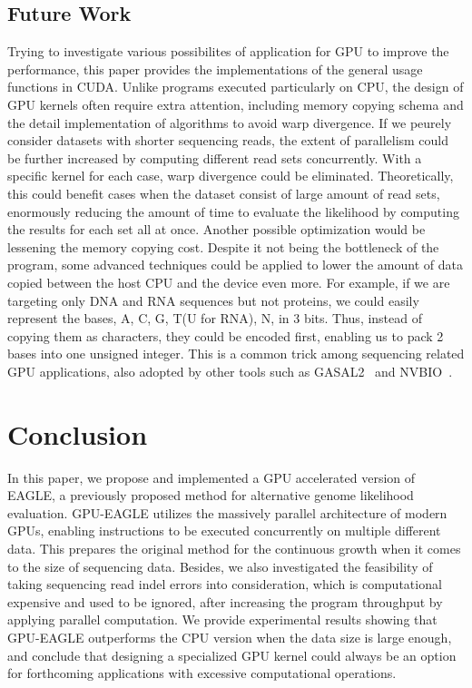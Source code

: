 \documentclass{PHlab-thesis}
\begin{document}
\section{Future Work}
Trying to investigate various possibilites of application for GPU to improve the performance, this paper provides the implementations of the general usage functions in CUDA. Unlike programs executed particularly on CPU, the design of GPU kernels often require extra attention, including memory copying schema and the detail implementation of algorithms to avoid warp divergence. If we peurely consider datasets with shorter sequencing reads, the extent of parallelism could be further increased by computing different read sets concurrently. With a specific kernel for each case, warp divergence could be eliminated. Theoretically, this could benefit cases when the dataset consist of large amount of read sets, enormously reducing the amount of time to evaluate the likelihood by computing the results for each set all at once. Another possible optimization would be lessening the memory copying cost. Despite it not being the bottleneck of the program, some advanced techniques could be applied to lower the amount of data copied between the host CPU and the device even more. For example, if we are targeting only DNA and RNA sequences but not proteins, we could easily represent the bases, A, C, G, T(U for RNA), N, in 3 bits. Thus, instead of copying them as characters, they could be encoded first, enabling us to pack 2 bases into one unsigned integer. This is a common trick among sequencing related GPU applications, also adopted by other tools such as GASAL2~\cite{ahmed2019gasal2} and NVBIO~\cite{nvbio2015}.

\chapter{Conclusion}
In this paper, we propose and implemented a GPU accelerated version of EAGLE, a previously proposed method for alternative genome likelihood evaluation. GPU-EAGLE utilizes the massively parallel architecture of modern GPUs, enabling instructions to be executed concurrently on multiple different data. This prepares the original method for the continuous growth when it comes to the size of sequencing data. Besides, we also investigated the feasibility of taking sequencing read indel errors into consideration, which is computational expensive and used to be ignored, after increasing the program throughput by applying parallel computation. We provide experimental results showing that GPU-EAGLE outperforms the CPU version when the data size is large enough, and conclude that designing a specialized GPU kernel could always be an option for forthcoming applications with excessive computational operations.

\newpage
{}
\printbibliography
\end{document}
